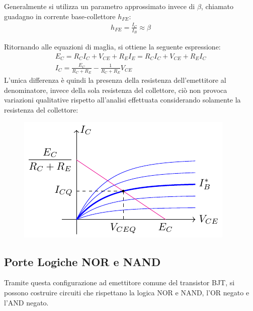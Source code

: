 \documentclass{article}
\numberwithin{equation}{subsection}
\begin{document}
Generalmente si utilizza un parametro approssimato invece di $\beta$, chiamato guadagno in corrente base-collettore $h_{FE}$:
\begin{gather*}
    h_{FE}=\displaystyle\frac{I_C}{I_B}\approx\beta
\end{gather*}

Ritornando alle equazioni di maglia, si ottiene la seguente espressione:
\begin{gather*}
    E_C=R_CI_C+V_{CE}+R_EI_E=R_CI_C+V_{CE}+R_EI_C\\
    I_C=\displaystyle\frac{E_{C}}{R_C+R_E}-\frac{1}{R_C+R_E}V_{CE}
\end{gather*}
L'unica differenza è quindi la presenza della resistenza dell'emettitore al denominatore, invece della sola resistenza del collettore, ciò non 
provoca variazioni qualitative rispetto all'analisi effettuata considerando solamente la resistenza del collettore:
\begin{figure}[H]%
    \centering
    \includegraphics{andamento-collettore-emettitore.pdf}%
    \label{fig:andamento-collettore-emettitore}
\end{figure}

\subsection{Porte Logiche NOR e NAND}

Tramite questa configurazione ad emettitore comune del transistor BJT, si possono costruire circuiti che rispettano la logica NOR e NAND, l'OR negato e 
l'AND negato. 
\end{document}
